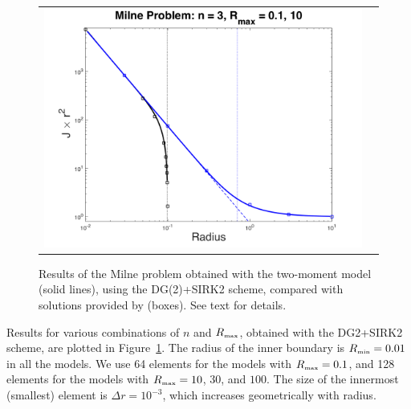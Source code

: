 \documentclass[10pt,preprint]{aastex}
\begin{document}
\begin{figure}
\begin{center}
\begin{tabular}{cc}
      \includegraphics[scale=0.4]{./Figures/MilneProblem1D_n30.png}
    \end{tabular}
  \end{center}
  \caption{Results of the Milne problem obtained with the two-moment model (solid lines), using the DG(2)+SIRK2 scheme, compared with solutions provided by \citep{hummerRybicki_1971} (boxes).  See text for details.}
  \label{fig:milneProblem1D}
\end{figure}

Results for various combinations of $n$ and $R_{\mbox{\tiny max}}$, obtained with the DG2+SIRK2 scheme, are plotted in Figure~\ref{fig:milneProblem1D}.  
The radius of the inner boundary is $R_{\mbox{\tiny min}}=0.01$ in all the models.  
We use 64 elements for the models with $R_{\mbox{\tiny max}}=0.1$, and 128 elements for the models with $R_{\mbox{\tiny max}}=10$, $30$, and $100$.  
The size of the innermost (smallest) element is $\Delta r=10^{-3}$, which increases geometrically with radius.  
\end{document}
